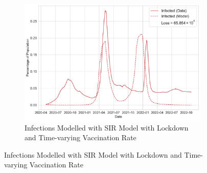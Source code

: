 \documentclass[tikz,fleqn,12pt]{wlscirep}
\begin{document}
\begin{figure}[htbp!]
  \begin{subfigure}[t]{\textwidth}
    \centering
    \includegraphics[scale=0.50]{images/SIR_model_with_lockdown_with_vaccination_time_varying_nu_infections_IND.pdf}
    \caption{Infections Modelled with SIR Model with Lockdown and Time-varying Vaccination Rate}
    \label{fig:SIR_model_with_lockdown_with_vaccination_infections_time_varying_nu_IND}
  \end{subfigure}
\end{figure}
\end{document}
